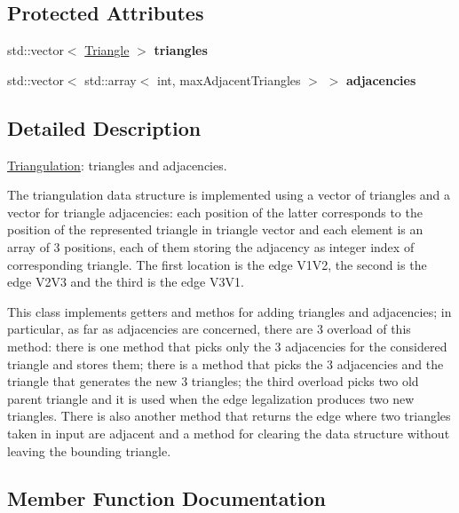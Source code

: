\subsection*{Protected Attributes}
\begin{DoxyCompactItemize}
\item 
\mbox{\label{classTriangulation_a382d1156fe26a4460d4558a5f37c307c}} 
std\+::vector$<$ \hyperlink{classTriangle}{Triangle} $>$ {\bfseries triangles}
\item 
\mbox{\label{classTriangulation_a81884b0393ebe68d4f58253d717c476b}} 
std\+::vector$<$ std\+::array$<$ int, max\+Adjacent\+Triangles $>$ $>$ {\bfseries adjacencies}
\end{DoxyCompactItemize}


\subsection{Detailed Description}
\hyperlink{classTriangulation}{Triangulation}\+: triangles and adjacencies. 

The triangulation data structure is implemented using a vector of triangles and a vector for triangle adjacencies\+: each position of the latter corresponds to the position of the represented triangle in triangle vector and each element is an array of 3 positions, each of them storing the adjacency as integer index of corresponding triangle. The first location is the edge V1\+V2, the second is the edge V2\+V3 and the third is the edge V3\+V1.

This class implements getters and methos for adding triangles and adjacencies; in particular, as far as adjacencies are concerned, there are 3 overload of this method\+: there is one method that picks only the 3 adjacencies for the considered triangle and stores them; there is a method that picks the 3 adjacencies and the triangle that generates the new 3 triangles; the third overload picks two old parent triangle and it is used when the edge legalization produces two new triangles. There is also another method that returns the edge where two triangles taken in input are adjacent and a method for clearing the data structure without leaving the bounding triangle. 

\subsection{Member Function Documentation}
\mbox{\label{classTriangulation_acd8f87a0fb57f698421f5e9ffeb28152}} 
